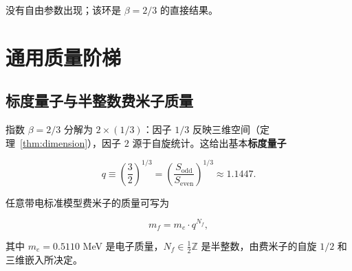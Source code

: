 \documentclass[12pt,a4paper]{article}
\theoremstyle{remark}
\begin{document}
	没有自由参数出现；该环是 \(\beta = 2/3\) 的直接结果。
	
	\section{通用质量阶梯}
	\label{sec:mass-ladder}
	
	\subsection{标度量子与半整数费米子质量}
	
	指数 \(\beta = 2/3\) 分解为 \(2 \times (1/3)\)：因子 \(1/3\) 反映三维空间（定理~\ref{thm:dimension}），因子 \(2\) 源于自旋统计。这给出基本\textbf{标度量子}
	
	\begin{equation}
		q \equiv \left(\frac{3}{2}\right)^{1/3}
		= \left(\frac{S_{\mathrm{odd}}}{S_{\mathrm{even}}}\right)^{1/3} \approx 1.1447.
	\end{equation}
	
	任意带电标准模型费米子的质量可写为
	
	\begin{equation}
		\boxed{m_f = m_e \cdot q^{N_f}},
		\label{eq:mass-quantization}
	\end{equation}
	
	其中 \(m_e = 0.5110\) MeV 是电子质量，\(N_f \in \frac{1}{2}\mathbb{Z}\) 是半整数，由费米子的自旋 \(1/2\) 和三维嵌入所决定。
	
\end{document}
